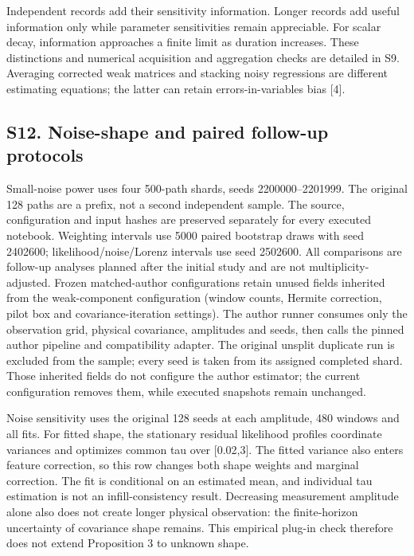 \documentclass[
  american,
  11pt,
]{article}
\begin{document}
Independent records add their sensitivity information. Longer records
add useful information only while parameter sensitivities remain
appreciable. For scalar decay, information approaches a finite limit as
duration increases. These distinctions and numerical acquisition and
aggregation checks are detailed in S9. Averaging corrected weak matrices
and stacking noisy regressions are different estimating equations; the
latter can retain errors-in-variables bias {[}4{]}.

\subsection{S12. Noise-shape and paired follow-up
protocols}\label{s12.-noise-shape-and-paired-follow-up-protocols}

Small-noise power uses four 500-path shards, seeds 2200000--2201999. The
original 128 paths are a prefix, not a second independent sample. The
source, configuration and input hashes are preserved separately for
every executed notebook. Weighting intervals use 5000 paired bootstrap
draws with seed 2402600; likelihood/noise/Lorenz intervals use seed
2502600. All comparisons are follow-up analyses planned after the
initial study and are not multiplicity-adjusted. Frozen matched-author
configurations retain unused fields inherited from the weak-component
configuration (window counts, Hermite correction, pilot box and
covariance-iteration settings). The author runner consumes only the
observation grid, physical covariance, amplitudes and seeds, then calls
the pinned author pipeline and compatibility adapter. The original
unsplit duplicate run is excluded from the sample; every seed is taken
from its assigned completed shard. Those inherited fields do not
configure the author estimator; the current configuration removes them,
while executed snapshots remain unchanged.

Noise sensitivity uses the original 128 seeds at each amplitude, 480
windows and all fits. For fitted shape, the stationary residual
likelihood profiles coordinate variances and optimizes common tau over
{[}0.02,3{]}. The fitted variance also enters feature correction, so
this row changes both shape weights and marginal correction. The fit is
conditional on an estimated mean, and individual tau estimation is not
an infill-consistency result. Decreasing measurement amplitude alone
also does not create longer physical observation: the finite-horizon
uncertainty of covariance shape remains. This empirical plug-in check
therefore does not extend Proposition 3 to unknown shape.
\end{document}
